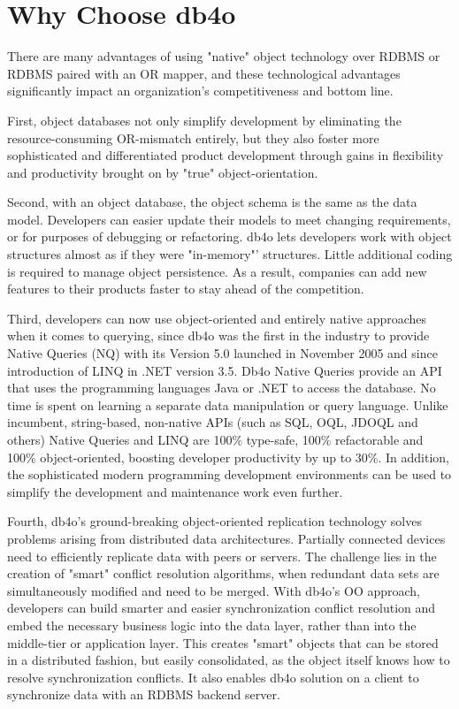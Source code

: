 \section{Why Choose db4o}
\label{ref:product-philosophy-why-choose-db4o}

There are many advantages of using "native" object technology over RDBMS or RDBMS paired with an OR mapper, and these technological advantages significantly impact an organization's competitiveness and bottom line.

First, object databases not only simplify development by eliminating the resource-consuming OR-mismatch entirely, but they also foster more sophisticated and differentiated product development through gains in flexibility and productivity brought on by "true" object-orientation.

Second, with an object database, the object schema is the same as the data model. Developers can easier update their models to meet changing requirements, or for purposes of debugging or refactoring. db4o lets developers work with object structures almost as if they were "in-memory"' structures. Little additional coding is required to manage object persistence. As a result, companies can add new features to their products faster to stay ahead of the competition.

Third, developers can now use object-oriented and entirely native approaches when it comes to querying, since db4o was the first in the industry to provide Native Queries (NQ) with its Version 5.0 launched in November 2005 and since introduction of LINQ in .NET version 3.5. Db4o Native Queries provide an API that uses the programming languages Java or .NET to access the database. No time is spent on learning a separate data manipulation or query language. Unlike incumbent, string-based, non-native APIs (such as SQL, OQL, JDOQL and others) Native Queries and LINQ are 100\% type-safe, 100\% refactorable and 100\% object-oriented, boosting developer productivity by up to 30\%. In addition, the sophisticated modern programming development environments can be used to simplify the development and maintenance work even further.

Fourth, db4o's ground-breaking object-oriented replication technology solves problems arising from distributed data architectures. Partially connected devices need to efficiently replicate data with peers or servers. The challenge lies in the creation of "smart" conflict resolution algorithms, when redundant data sets are simultaneously modified and need to be merged. With db4o's OO approach, developers can build smarter and easier synchronization conflict resolution and embed the necessary business logic into the data layer, rather than into the middle-tier or application layer. This creates "smart" objects that can be stored in a distributed fashion, but easily consolidated, as the object itself knows how to resolve synchronization conflicts. It also enables db4o solution on a client to synchronize data with an RDBMS backend server.

